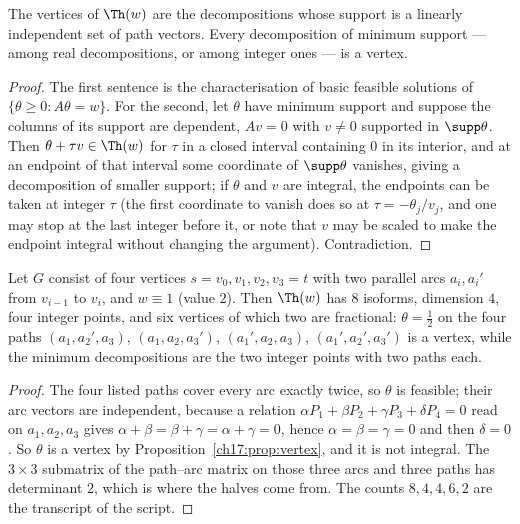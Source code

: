 \begin{proposition}\label{ch17:prop:vertex}
The vertices of $\Th(w)$ are the decompositions whose support is a linearly independent set
of path vectors. Every decomposition of minimum support --- among real decompositions, or
among integer ones --- is a vertex.
\end{proposition}

\begin{proof}
The first sentence is the characterisation of basic feasible solutions of
$\{\theta\ge0:A\theta=w\}$. For the second, let $\theta$ have minimum support and suppose the
columns of its support are dependent, $Av=0$ with $v\ne0$ supported in $\supp\theta$. Then
$\theta+\tau v\in\Th(w)$ for $\tau$ in a closed interval containing $0$ in its interior, and
at an endpoint of that interval some coordinate of $\supp\theta$ vanishes, giving a
decomposition of smaller support; if $\theta$ and $v$ are integral, the endpoints can be
taken at integer $\tau$ (the first coordinate to vanish does so at $\tau=-\theta_j/v_j$, and
one may stop at the last integer before it, or note that $v$ may be scaled to make the
endpoint integral without changing the argument). Contradiction.
\end{proof}

\begin{proposition}\label{ch17:prop:frac}
Let $G$ consist of four vertices $s=v_0,v_1,v_2,v_3=t$ with two parallel arcs
$a_i,a_i'$ from $v_{i-1}$ to $v_i$, and $w\equiv1$ (value $2$). Then $\Th(w)$ has $8$
isoforms, dimension $4$, four integer points, and six vertices of which two are fractional:
$\theta=\tfrac12$ on the four paths $(a_1,a_2',a_3)$, $(a_1,a_2,a_3')$, $(a_1',a_2,a_3)$,
$(a_1',a_2',a_3')$ is a vertex, while the minimum decompositions are the two integer
points with two paths each.
\end{proposition}

\begin{proof}
The four listed paths cover every arc exactly twice, so $\theta$ is feasible; their arc
vectors are independent, because a relation $\alpha P_1+\beta P_2+\gamma P_3+\delta P_4=0$
read on $a_1,a_2,a_3$ gives $\alpha+\beta=\beta+\gamma=\alpha+\gamma=0$, hence
$\alpha=\beta=\gamma=0$ and then $\delta=0$. So $\theta$ is a vertex by
Proposition~\ref{ch17:prop:vertex}, and it is not integral. The $3\times3$ submatrix of the
path--arc matrix on those three arcs and three paths has determinant $2$, which is where the
halves come from. The counts $8,4,4,6,2$ are the transcript of the script.
\end{proof}

